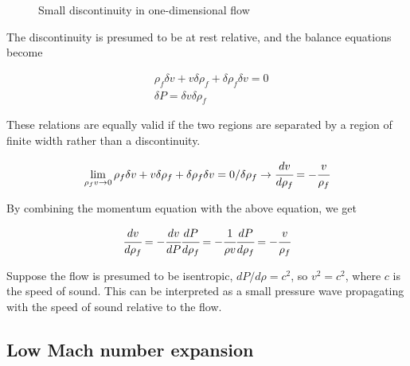 \documentclass[a4paper,fleqn]{cas-dc}
\begin{document}
\begin{figure}[!h]
	\centering
	\caption{Small discontinuity in one-dimensional flow}
	\label{fig: Discontinuity_slow_flow}
\end{figure} 

The discontinuity is presumed to be at rest relative, and the balance equations become		

{\footnotesize
	\begin{align*}
		&\rho_f \delta v + v \delta \rho_f + \delta \rho_f \delta v = 0 \\
		&\delta P = \delta v \delta \rho_f
	\end{align*}
}

These relations are equally valid if the two regions are separated by a region of finite width rather than a discontinuity. 

{\footnotesize
	\begin{equation*}
		\lim_{\rho_f v \rightarrow 0} \rho_f \delta v + v \delta \rho_f + \delta \rho_f \delta v = 0 / \delta \rho_f \rightarrow \cfrac{d v}{d \rho_f} = - \cfrac{v}{\rho_f}
	\end{equation*}
}

By combining the momentum equation with the above equation, we get

{\footnotesize
	\begin{equation*}
		\cfrac{d v}{d \rho_f} = - \cfrac{d v}{dP} \cfrac{d P}{d \rho_f} = -\cfrac{1}{\rho v} \cfrac{dP}{d\rho_f} = -\cfrac{v}{\rho_f}
	\end{equation*}
}

Suppose the flow is presumed to be isentropic, $dP/d\rho = c^2$, so $v^2=c^2$, where $c$ is the speed of sound. This can be interpreted as a small pressure wave propagating with the speed of sound relative to the flow.

\subsection{Low Mach number expansion} \label{CH:Low_Mach_chapter}
%

\end{document}
